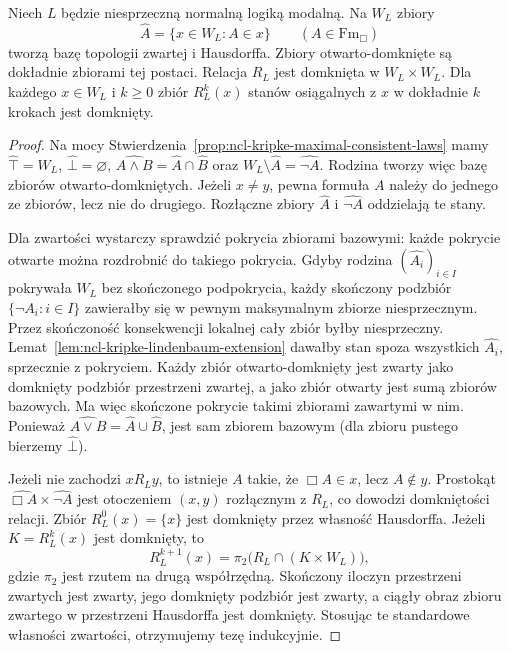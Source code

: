 \begin{lemat}
\label{lem:ncl-kripke-canonical-stone-topology}
Niech $L$ będzie niesprzeczną normalną logiką
modalną. Na $W_L$ zbiory
\[
 \widehat A=\{x\in W_L:A\in x\}
 \qquad(A\in\mathrm{Fm}_{\Box})
\]
tworzą bazę topologii zwartej i Hausdorffa.
Zbiory otwarto-domknięte są dokładnie
zbiorami tej postaci. Relacja $R_L$ jest
domknięta w $W_L\times W_L$.
Dla każdego $x\in W_L$ i $k\geq0$ zbiór
$R_L^k(x)$ stanów osiągalnych z $x$ w
dokładnie $k$ krokach jest domknięty.
\end{lemat}
\begin{proof}
Na mocy
Stwierdzenia~\ref{prop:ncl-kripke-maximal-consistent-laws}
mamy $\widehat\top=W_L$, $\widehat\bot=\varnothing$,
$\widehat{A\wedge B}=\widehat A\cap\widehat B$
oraz $W_L\setminus\widehat A=\widehat{\neg A}$.
Rodzina tworzy więc bazę zbiorów
otwarto-domkniętych. Jeżeli $x\ne y$,
pewna formuła $A$ należy do jednego ze
zbiorów, lecz nie do drugiego.
Rozłączne zbiory $\widehat A$ i
$\widehat{\neg A}$ oddzielają te stany.

Dla zwartości wystarczy sprawdzić pokrycia
zbiorami bazowymi: każde pokrycie otwarte
można rozdrobnić do takiego pokrycia.
Gdyby rodzina $(\widehat{A_i})_{i\in I}$
pokrywała $W_L$ bez skończonego podpokrycia,
każdy skończony podzbiór
$\{\neg A_i:i\in I\}$ zawierałby się w
pewnym maksymalnym zbiorze niesprzecznym.
Przez skończoność konsekwencji lokalnej
cały zbiór byłby niesprzeczny.
Lemat~\ref{lem:ncl-kripke-lindenbaum-extension}
dawałby stan spoza wszystkich
$\widehat{A_i}$, sprzecznie z pokryciem.
Każdy zbiór otwarto-domknięty jest zwarty
jako domknięty podzbiór przestrzeni zwartej,
a jako zbiór otwarty jest sumą zbiorów
bazowych. Ma więc skończone pokrycie
takimi zbiorami zawartymi w nim.
Ponieważ $\widehat{A\vee B}=\widehat A\cup\widehat B$,
jest sam zbiorem bazowym (dla zbioru pustego
bierzemy $\widehat\bot$).

Jeżeli nie zachodzi $xR_Ly$, to istnieje
$A$ takie, że $\Box A\in x$, lecz $A\notin y$.
Prostokąt $\widehat{\Box A}\times\widehat{\neg A}$
jest otoczeniem $(x,y)$ rozłącznym z $R_L$,
co dowodzi domkniętości relacji.
Zbiór $R_L^0(x)=\{x\}$ jest domknięty
przez własność Hausdorffa.
Jeżeli $K=R_L^k(x)$ jest domknięty, to
\[
 R_L^{k+1}(x)=\pi_2\bigl(R_L\cap(K\times W_L)\bigr),
\]
gdzie $\pi_2$ jest rzutem na drugą współrzędną.
Skończony iloczyn przestrzeni zwartych
jest zwarty, jego domknięty podzbiór jest
zwarty, a ciągły obraz zbioru zwartego
w przestrzeni Hausdorffa jest domknięty.
Stosując te standardowe własności zwartości,
otrzymujemy tezę indukcyjnie.
\end{proof}

